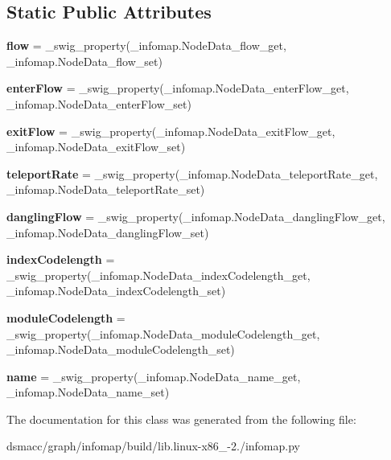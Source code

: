 \subsection*{Static Public Attributes}
\begin{DoxyCompactItemize}
\item 
\mbox{\label{classinfomap_1_1NodeData_a00c80e3b1fa11c8a20eeb53917fe5797}} 
{\bfseries flow} = \+\_\+swig\+\_\+property(\+\_\+infomap.\+Node\+Data\+\_\+flow\+\_\+get, \+\_\+infomap.\+Node\+Data\+\_\+flow\+\_\+set)
\item 
\mbox{\label{classinfomap_1_1NodeData_a0e9e50bd8fa4ead3075f8c5c42ed00e4}} 
{\bfseries enter\+Flow} = \+\_\+swig\+\_\+property(\+\_\+infomap.\+Node\+Data\+\_\+enter\+Flow\+\_\+get, \+\_\+infomap.\+Node\+Data\+\_\+enter\+Flow\+\_\+set)
\item 
\mbox{\label{classinfomap_1_1NodeData_a58945f5ba89633430e75f3ae3bbab663}} 
{\bfseries exit\+Flow} = \+\_\+swig\+\_\+property(\+\_\+infomap.\+Node\+Data\+\_\+exit\+Flow\+\_\+get, \+\_\+infomap.\+Node\+Data\+\_\+exit\+Flow\+\_\+set)
\item 
\mbox{\label{classinfomap_1_1NodeData_af6e17b37000cb89ac3f8534979cc2455}} 
{\bfseries teleport\+Rate} = \+\_\+swig\+\_\+property(\+\_\+infomap.\+Node\+Data\+\_\+teleport\+Rate\+\_\+get, \+\_\+infomap.\+Node\+Data\+\_\+teleport\+Rate\+\_\+set)
\item 
\mbox{\label{classinfomap_1_1NodeData_a15b89e2afc25938e38a744ef16dfca25}} 
{\bfseries dangling\+Flow} = \+\_\+swig\+\_\+property(\+\_\+infomap.\+Node\+Data\+\_\+dangling\+Flow\+\_\+get, \+\_\+infomap.\+Node\+Data\+\_\+dangling\+Flow\+\_\+set)
\item 
\mbox{\label{classinfomap_1_1NodeData_a7f27b30d19fe9d6350feb427d699a519}} 
{\bfseries index\+Codelength} = \+\_\+swig\+\_\+property(\+\_\+infomap.\+Node\+Data\+\_\+index\+Codelength\+\_\+get, \+\_\+infomap.\+Node\+Data\+\_\+index\+Codelength\+\_\+set)
\item 
\mbox{\label{classinfomap_1_1NodeData_acae6f2deeaa345d7a4c98324483dbc9a}} 
{\bfseries module\+Codelength} = \+\_\+swig\+\_\+property(\+\_\+infomap.\+Node\+Data\+\_\+module\+Codelength\+\_\+get, \+\_\+infomap.\+Node\+Data\+\_\+module\+Codelength\+\_\+set)
\item 
\mbox{\label{classinfomap_1_1NodeData_a4181ee4fd275109887510087b6d9ffc6}} 
{\bfseries name} = \+\_\+swig\+\_\+property(\+\_\+infomap.\+Node\+Data\+\_\+name\+\_\+get, \+\_\+infomap.\+Node\+Data\+\_\+name\+\_\+set)
\end{DoxyCompactItemize}


The documentation for this class was generated from the following file\+:\begin{DoxyCompactItemize}
\item 
dsmacc/graph/infomap/build/lib.\+linux-\/x86\+\_-\/2./infomap.\+py\end{DoxyCompactItemize}
